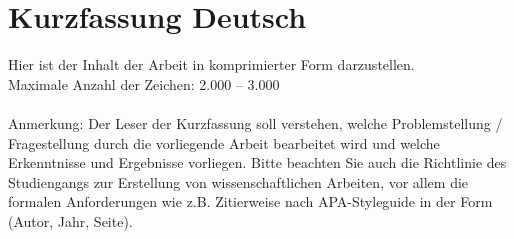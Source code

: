 \newpage
\section*{Kurzfassung Deutsch}
Hier ist der Inhalt der Arbeit in komprimierter Form darzustellen. 
\\Maximale Anzahl der Zeichen: 2.000 – 3.000
\\
\\
Anmerkung: 
Der Leser der Kurzfassung soll verstehen, welche Problemstellung / Fragestellung durch die vorliegende Arbeit bearbeitet wird und welche Erkenntnisse und Ergebnisse vorliegen.
Bitte beachten Sie auch die Richtlinie des Studiengangs zur Erstellung von wissenschaftlichen Arbeiten, vor allem die formalen Anforderungen wie z.B. Zitierweise nach APA-Styleguide in der Form (Autor, Jahr, Seite). 
\\
\\
\blindtext[1]